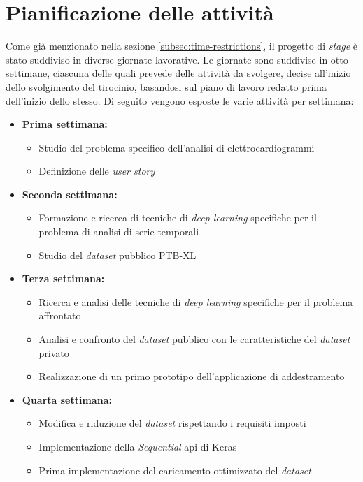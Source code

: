 \section{Pianificazione delle attività}\label{sec:activity-planning}\noindent
Come già menzionato nella sezione \ref{subsec:time-restrictions}, il progetto di \textit{stage} è stato suddiviso in diverse giornate lavorative.
Le giornate sono suddivise in otto settimane, ciascuna delle quali prevede delle attività da svolgere, decise all'inizio dello svolgimento del tirocinio, basandosi sul piano di lavoro redatto prima dell'inizio dello stesso.
Di seguito vengono esposte le varie attività per settimana:
\begin{itemize}
    \item \textbf{Prima settimana:}
        \begin{itemize}
            \item Studio del problema specifico dell'analisi di elettrocardiogrammi
            \item Definizione delle \textit{user story}
        \end{itemize}
    \item \textbf{Seconda settimana:}
        \begin{itemize}
            \item Formazione e ricerca di tecniche di \textit{deep learning} specifiche per il problema di analisi di serie temporali
            \item Studio del \textit{dataset} pubblico PTB-XL
        \end{itemize}

    \item \textbf{Terza settimana:}
        \begin{itemize}
            \item Ricerca e analisi delle tecniche di \textit{deep learning} specifiche per il problema affrontato
            \item Analisi e confronto del \textit{dataset} pubblico con le caratteristiche del \textit{dataset} privato
            \item Realizzazione di un primo prototipo dell'applicazione di addestramento
        \end{itemize}
    \item \textbf{Quarta settimana:}
        \begin{itemize}
            \item Modifica e riduzione del \textit{dataset} rispettando i requisiti imposti
            \item Implementazione della \textit{Sequential} \gls{api} di Keras
            \item Prima implementazione del caricamento ottimizzato del \textit{dataset}
        \end{itemize}


\end{itemize}
